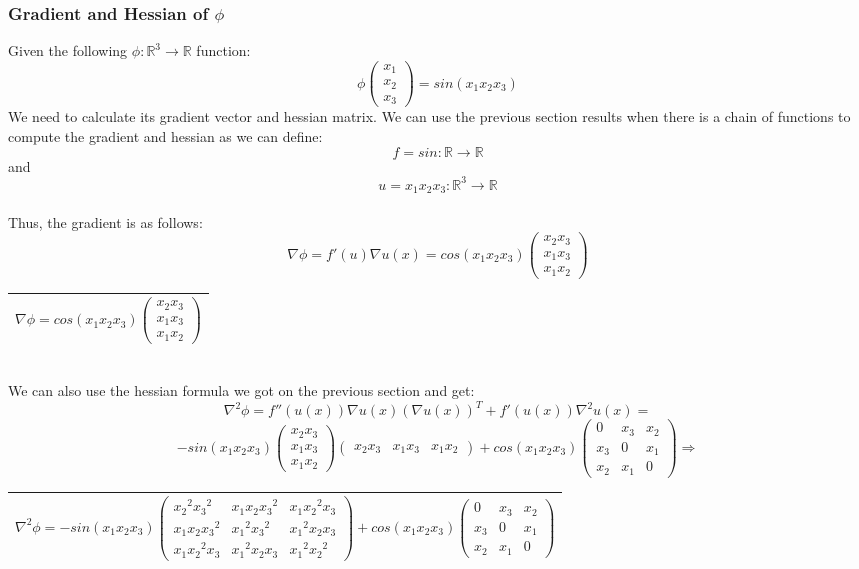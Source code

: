 \documentclass{article}
\begin{document}
\subsubsection{Gradient and Hessian of $\phi$}
Given the following $\phi:\mathbb{R}^3\rightarrow\mathbb{R}$ function:
$$\phi \begin{pmatrix}x_1\\x_2\\x_3 \end{pmatrix} = sin(x_1x_2x_3)$$
We need to calculate its gradient vector and hessian matrix.
We can use the previous section results when there is a chain of functions to compute the gradient and hessian as we can define:
$$f=sin:\mathbb{R}\rightarrow\mathbb{R}$$ and $$u=x_1x_2x_3:\mathbb{R}^3\rightarrow\mathbb{R}$$
\\
Thus, the gradient is as follows:
$$\nabla \phi = f'(u)\nabla u(x) = cos(x_1x_2x_3)\begin{pmatrix}x_2x_3\\x_1x_3\\x_1x_2 \end{pmatrix}$$
\begin{center}
\begin{tabular}{ |c| }
\hline
$$\nabla \phi = cos(x_1x_2x_3)\begin{pmatrix}x_2x_3\\x_1x_3\\x_1x_2 \end{pmatrix}$$\\
\hline
\end{tabular}
\end{center}
\\
We can also use the hessian formula we got on the previous section and get:
$$\nabla^2 \phi = f''(u(x))\nabla u(x)(\nabla u(x))^T + f'(u(x))\nabla^2 u(x)=$$
$$-sin(x_1x_2x_3)\begin{pmatrix}x_2x_3\\x_1x_3\\x_1x_2 \end{pmatrix}\begin{pmatrix}x_2x_3 & x_1x_3 & x_1x_2 \end{pmatrix} + cos(x_1x_2x_3)\begin{pmatrix}0 & x_3 & x_2\\x_3 & 0 & x_1\\x_2 & x_1 & 0 \end{pmatrix} \Rightarrow$$
\begin{center}
\begin{tabular}{ |c| }
\hline
$$\nabla^2 \phi = -sin(x_1x_2x_3)\begin{pmatrix}{x_2}^2{x_3}^2 & x_1x_2{x_3}^2 & x_1{x_2}^2x_3\\x_1x_2{x_3}^2 & {x_1}^2{x_3}^2 & {x_1}^2x_2x_3\\x_1{x_2}^2x_3 & {x_1}^2x_2x_3 & {x_1}^2{x_2}^2 \end{pmatrix}+ cos(x_1x_2x_3)\begin{pmatrix}0 & x_3 & x_2\\x_3 & 0 & x_1\\x_2 & x_1 & 0 \end{pmatrix}$$\\
\hline
\end{tabular}
\end{center}
\end{document}
